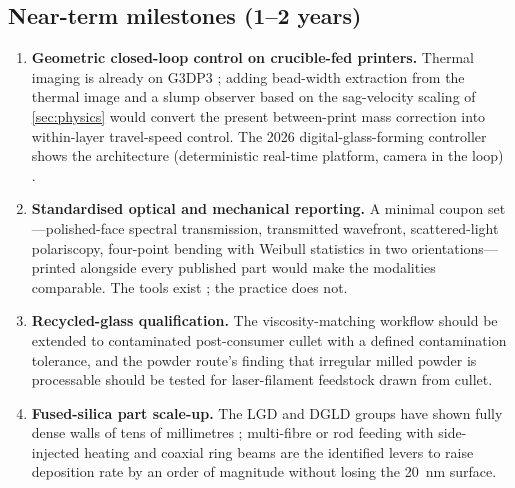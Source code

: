 \subsection{Near-term milestones (1--2 years)}
\begin{enumerate}[leftmargin=*,itemsep=2pt]
  \item \textbf{Geometric closed-loop control on crucible-fed printers.} Thermal imaging is already on G3DP3 \citep{stern2024cgc}; adding bead-width extraction from the thermal image and a slump observer based on the sag-velocity scaling of \cref{sec:physics} would convert the present between-print mass correction into within-layer travel-speed control. The 2026 digital-glass-forming controller shows the architecture (deterministic real-time platform, camera in the loop) \citep{dgf2026control}.
  \item \textbf{Standardised optical and mechanical reporting.} A minimal coupon set---polished-face spectral transmission, transmitted wavefront, scattered-light polariscopy, four-point bending with Weibull statistics in two orientations---printed alongside every published part would make the modalities comparable. The tools exist \citep{aben2008,inamura2018}; the practice does not.
  \item \textbf{Recycled-glass qualification.} The viscosity-matching workflow \citep{stern2024cgc} should be extended to contaminated post-consumer cullet with a defined contamination tolerance, and the powder route's finding that irregular milled powder is processable \citep{slmirregular2023} should be tested for laser-filament feedstock drawn from cullet.
  \item \textbf{Fused-silica part scale-up.} The LGD and DGLD groups have shown fully dense walls of tens of millimetres \citep{lgd2024homog,kth2022bonding}; multi-fibre or rod feeding with side-injected heating \citep{capps2021interface} and coaxial ring beams \citep{lgd2021coaxial} are the identified levers to raise deposition rate by an order of magnitude without losing the \SI{20}{nm} surface.
\end{enumerate}

